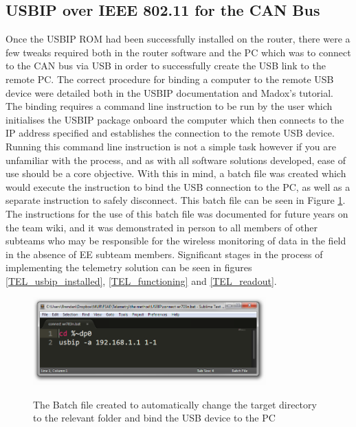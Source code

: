 \subsection{USBIP over IEEE 802.11 for the CAN Bus}
Once the USBIP ROM had been successfully installed on the router, there were a few tweaks required both in the router software and the PC which was to connect to the CAN bus via USB in order to successfully create the USB link to the remote PC. The correct procedure for binding a computer to the remote USB device were detailed both in the USBIP documentation\cite{MAN_USBIP} and Madox's tutorial\cite{madox_exampleusbip}. The binding requires a command line instruction to be run by the user which initialises the USBIP package onboard the computer which then connects to the IP address specified and establishes the connection to the remote USB device. Running this command line instruction is not a simple task however if you are unfamiliar with the process, and as with all software solutions developed, ease of use should be a core objective. With this in mind, a batch file was created which would execute the instruction to bind the USB connection to the PC, as well as a separate instruction to safely disconnect. This batch file can be seen in Figure \ref{TEL_usbipbatch}. The instructions for the use of this batch file was documented for future years on the team wiki, and it was demonstrated in person to all members of other subteams who may be responsible for the wireless monitoring of data in the field in the absence of EE subteam members. Significant stages in the process of implementing the telemetry solution can be seen in figures \ref{TEL_usbip_installed}, \ref{TEL_functioning} and \ref{TEL_readout}.

\begin{figure}[ht]
  \caption{The Batch file created to automatically change the target directory to the relevant folder and bind the USB device to the PC}
  \centering
    \includegraphics[width=0.8\textwidth]{Images/Telemetry/TEL_usbipbatch.png}
    \label{TEL_usbipbatch}
\end{figure}

